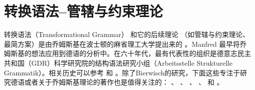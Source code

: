 
\chapter{转换语法--管辖与约束理论}
\label{Kapitel-GB}\label{chap-GB}\label{chap-gb}

转换语法（Transformational Grammar） 和它的后续理论
（如管辖与约束理论、最简方案）是由乔姆斯基在波士顿的麻省理工大学提出来的
\citep{Chomsky57a,Chomsky65a,Chomsky75a,Chomsky81a,Chomsky86b,Chomsky95a-u}。Manfred
\citet{Bierwisch63} 最早将乔姆斯基的想法应用到德语的分析中。在六十年代，最有代表性的组织是德意志民主
共和国（GDR）科学研究院的结构语法研究小组（Arbeitsstelle Strukturelle Grammatik）。相关历史可以参考
\citealp{Bierwisch92} 和 \citealp{Vater2010a}。除了Bierwisch的研究，下面这些专注于研究德语或者关于乔姆斯基理论的著作也是值得关注的： 、 、 、 、 和 。

